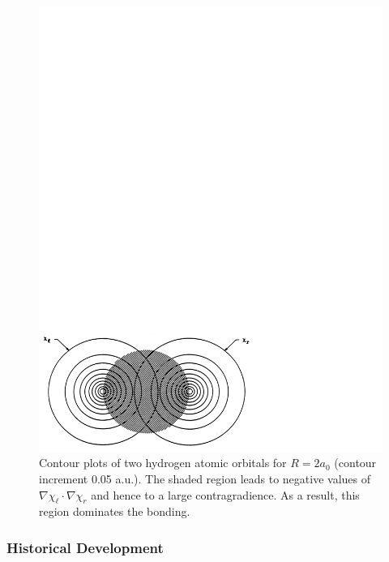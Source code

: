\begin{figure}
\includegraphics[scale=0.75]{fig2-14}
\caption{Contour plots of two hydrogen atomic orbitals for $R = 2 a_0$
(contour increment 0.05 a.u.). The shaded region leads to negative
  values of $\nabla\chi_\ell\cdot\nabla\chi_r$ and hence to a large
  contragradience. As a result, this region dominates the bonding.}
\label{fig2-14}
\end{figure}
    
\subsubsection{Historical Development}
    
